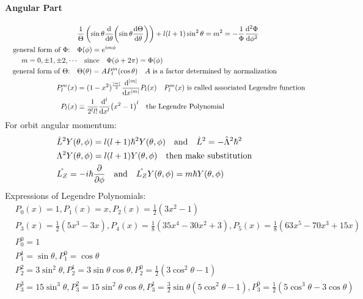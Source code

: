 \documentclass[a4paper,10pt]{article}
\begin{document}
\paragraph{Angular Part}
\begin{align*}
                                   & \frac{1}{\Theta}\left(\sin\theta\dv{\theta}(\sin\theta\dv{\Theta}{\theta})\right)+l(l+1)\sin^2\theta=m^2=-\frac{1}{\Phi}\dv[2]{\Phi}{\phi} \\
    \qq{general form of $\Phi$:}   & \Phi(\phi)=e^{im\phi}                                                                                                                      \\
    m=0,\pm1,\pm2,\cdots           & \qq{since}\Phi(\phi+2\pi)=\Phi(\phi)                                                                                                       \\
    \qq{general form of $\Theta$:} & \Theta(\theta)=AP_l^m(\cos\theta)\qq{$A$ is a factor determined by normalization}                                                          \\
    P_l^m(x)                       & =(1-x^2)^{\frac{\abs{m}}{2}}\dv[\abs{m}]{x}P_l(x)\qq{$P_l^m(x)$ is called associated Legendre function}                                    \\
    P_l(x)                         & \equiv\frac{1}{2^ll!}\dv[l]{x}(x^2-1)^l\qq{the Legendre Polynomial}
\end{align*}
For orbit angular momentum:
\begin{align*}
     & \hat{L}^2Y(\theta,\phi)=l(l+1)\hbar^2Y(\theta,\phi)\qq{and}\hat{L}^2=-\hat{\Lambda}^2\hbar^2 \\
     & \Lambda^2Y(\theta,\phi)=l(l+1)Y(\theta,\phi)\qq{then make substitution}                      \\
     & \hat{L_Z}=-i\hbar\pdv{\phi}\qq{and}\hat{L_Z}Y(\theta,\phi)=m\hbar Y(\theta,\phi)
\end{align*}
Expressions of Legendre Polynomials:
\begin{align*}
     & P_0(x)=1, P_1(x)=x, P_2(x)=\frac{1}{2}(3x^2-1)                                                                                                       \\
     & P_3(x)=\frac{1}{2}(5x^3-3x),P_4(x)=\frac{1}{8}(35x^4-30x^2+3), P_5(x)=\frac{1}{8}(63x^5-70x^3+15x)                                                   \\
     & P_0^0=1                                                                                                                                              \\
     & P_1^1=\sin\theta,P_1^0=\cos\theta                                                                                                                    \\
     & P_2^2=3\sin^2\theta,P_2^1=3\sin\theta\cos\theta,   P_2^0=\frac{1}{2}(3\cos^2\theta-1)                                                                \\
     & P_3^3=15\sin^3\theta,  P_3^2=15\sin^2\theta\cos\theta,  P_3^1=\frac{3}{2}\sin\theta(5\cos^2\theta-1),   P_3^0=\frac{1}{2}(5\cos^3\theta-3\cos\theta) \\
\end{align*}
\end{document}
